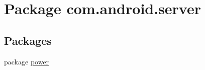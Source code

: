 \hypertarget{namespacecom_1_1android_1_1server}{\section{Package com.\-android.\-server}
\label{namespacecom_1_1android_1_1server}
}
\subsection*{Packages}
\begin{DoxyCompactItemize}
\item 
package \hyperlink{namespacecom_1_1android_1_1server_1_1power}{power}
\end{DoxyCompactItemize}
